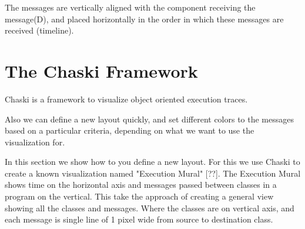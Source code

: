 \documentclass{sig-alternate}
\newcommand{\seclabel}[1]{\label{sec:#1}}
\begin{document}
The messages are vertically aligned with the component receiving the message(D), and placed horizontally in the order in which these messages are received (timeline).



\section{The Chaski Framework}\seclabel{framework}

Chaski is a framework to visualize object oriented execution traces. 

Also we can define a new layout quickly, and set different colors to the messages based on a particular criteria, depending on what we want to use the visualization for.


In this section we show how to you define a new layout. For this we use Chaski to create a known visualization named "Execution Mural" [??]. The Execution Mural shows time on the horizontal axis and messages passed between classes in a program on the vertical. This take the approach of creating a general view showing all the classes and messages. Where the classes are on vertical axis, and each message is single line of 1 pixel wide from source to destination class.
\end{document}
